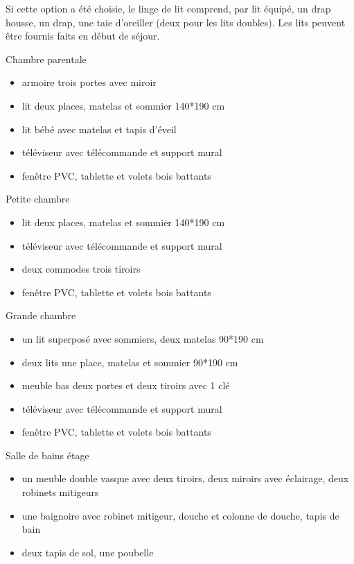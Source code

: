 \documentclass[a4paper,11pt]{article}
\begin{document}
Si cette option a été choisie, le linge de lit comprend, par lit équipé, un drap housse, un drap, une taie d'oreiller (deux pour les lits doubles). Les lits peuvent être fournis faits en début de séjour.
\vspace{0.5cm}


\vspace{0.25cm}

Chambre parentale
\begin{itemize}
\item armoire trois portes avec miroir
\item lit deux places, matelas et sommier 140*190 cm
\item lit bébé avec matelas et tapis d'éveil
\item téléviseur avec télécommande et support mural
\item fenêtre PVC, tablette et volets bois battants
\end{itemize}

\vspace{0.5cm}

Petite chambre
\begin{itemize}
\item lit deux places, matelas et sommier 140*190 cm
\item téléviseur avec télécommande et support mural
\item deux commodes trois tiroirs
\item fenêtre PVC, tablette et volets bois battants
\end{itemize}


\vspace{0.25cm}

Grande chambre
\begin{itemize}
\item un lit superposé avec sommiers, deux matelas 90*190 cm
\item deux lits une place, matelas et sommier 90*190 cm
\item meuble bas deux portes et deux tiroirs avec 1 clé 
\item téléviseur avec télécommande et support mural
\item fenêtre PVC, tablette et volets bois battants
\end{itemize}
\vspace{0.25cm}

Salle de bains étage
\begin{itemize}
\item un meuble double vasque avec deux tiroirs, deux miroirs avec éclairage, deux robinets mitigeurs
\item une baignoire avec robinet mitigeur, douche et colonne de douche, tapis de bain
\item deux tapis de sol, une poubelle
\end{itemize}
\end{document}
